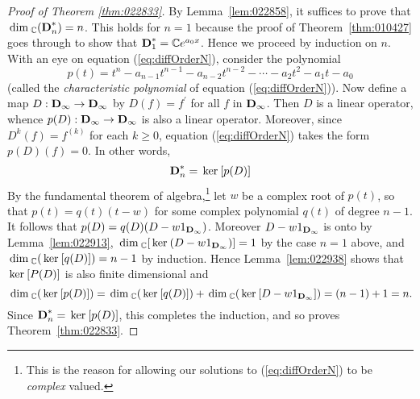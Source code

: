 \begin{proof}[Proof of Theorem \ref{thm:022833}]
By Lemma~\ref{lem:022858}, it suffices to prove that $\thinspace\operatorname{dim\medspace}_{\mathbb{C}}(\textbf{D}_n^*) = n$. This holds for $n = 1$ because the proof of Theorem~\ref{thm:010427} goes through to show that $\textbf{D}_1^* = \mathbb{C}e^{a_0x}$. Hence we proceed by induction on $n$. With an eye on equation (\ref{eq:diffOrderN}), consider the polynomial
\begin{equation*}
p(t) = t^n - a_{n-1}t^{n-1} - a_{n-2}t^{n-2} - \cdots - a_2t^2 - a_1t - a_0
\end{equation*}
(called the \textit{characteristic polynomial} of equation (\ref{eq:diffOrderN})). Now define a map $D : \textbf{D}_{\infty} \to \textbf{D}_{\infty}$ by $D(f) = f^\prime$ for all $f$ in $\textbf{D}_{\infty}$. Then $D$ is a linear operator, whence $p(D) : \textbf{D}_{\infty} \to \textbf{D}_{\infty}$ is also a linear operator. Moreover, since $D^{k}(f) = f^{(k)}$ for each $k \geq 0$, equation (\ref{eq:diffOrderN}) takes the form $p(D)(f) = 0$. In other words,
\begin{equation*}
\textbf{D}_n^* = \thinspace\operatorname{ker\medspace}[p(D)]
\end{equation*}
By the fundamental theorem of algebra,\footnote{This is the reason for allowing our solutions to (\ref{eq:diffOrderN}) to be \textit{complex} valued.} let $w$ be a complex root of $p(t)$, so that $p(t) = q(t)(t - w)$ for some complex polynomial $q(t)$ of degree $n - 1$. It follows that $p(D) = q(D)(D - w1_{\textbf{D}_\infty})$. Moreover $D - w1_{\textbf{D}_\infty}$ is onto by Lemma~\ref{lem:022913}, $\thinspace\operatorname{dim\medspace}_{\mathbb{C}}[\thinspace\operatorname{ker\medspace}(D - w1_{\textbf{D}_\infty})] = 1$ by the case $n = 1$ above, and $\thinspace\operatorname{dim\medspace}_{\mathbb{C}}(\thinspace\operatorname{ker\medspace}[q(D)]) = n - 1$ by induction. Hence Lemma~\ref{lem:022938} shows that $\thinspace\operatorname{ker\medspace}[P(D)]$ is also finite dimensional and
\begin{equation*}
\thinspace\operatorname{dim\medspace}_\mathbb{C}(\thinspace\operatorname{ker\medspace}[p(D)]) = \thinspace\operatorname{dim\medspace}_\mathbb{C}(\thinspace\operatorname{ker\medspace}[q(D)]) + \thinspace\operatorname{dim\medspace}_\mathbb{C}(\thinspace\operatorname{ker\medspace}[D - w1_{\textbf{D}_\infty}]) = (n -1) + 1 = n.
\end{equation*}
Since $\textbf{D}_n^* = \thinspace\operatorname{ker\medspace}[p(D)]$, this completes the induction, and so proves Theorem~\ref{thm:022833}.
\end{proof}

